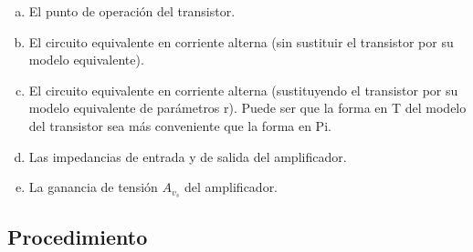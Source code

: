 \documentclass[12pt,a4paper]{article}
\begin{document}
\begin{enumerate}[(a)]
	\item El punto de operación del transistor.
	\item El circuito equivalente en corriente alterna (sin sustituir el transistor por su modelo equivalente).
	\item El circuito equivalente en corriente alterna (sustituyendo el transistor por su modelo equivalente de parámetros r). Puede ser que la forma en T del modelo del transistor sea más conveniente que la forma en Pi.
	\item Las impedancias de entrada y de salida del amplificador.
	\item La ganancia de tensión $A_{v_s}$ del amplificador.
\end{enumerate}

\newpage
\subsection*{Procedimiento}
\end{document}
